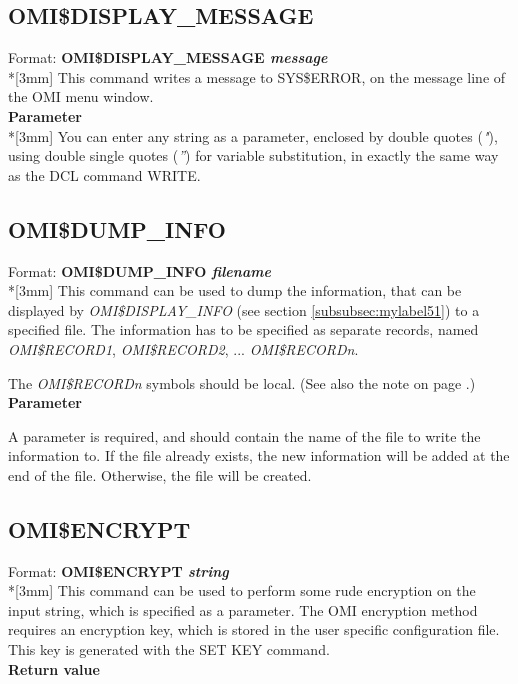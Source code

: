 \documentclass[a4paper]{book}
\renewcommand{\indent}{\hspace*{5mm}}
\begin{document}
\subsection{OMI{\$}DISPLAY{\_}MESSAGE}
\label{subsubsec:mylabel52}
\indent Format: \textbf{OMI{\$}DISPLAY{\_}MESSAGE \textit{message}}\\*[3mm]
This command writes a message to SYS{\$}ERROR, on the message line of the 
OMI menu window.\\[3mm]
\textbf{Parameter}\\*[3mm]
You can enter any string as a parameter, enclosed by double quotes (\textsl{"}), 
using double single quotes (\textsl{''}) for variable substitution, in exactly the 
same way as the DCL command WRITE.

\subsection{OMI{\$}DUMP{\_}INFO}
\label{subsubsec:mylabel53}

\indent Format: \textbf{OMI{\$}DUMP{\_}INFO \textit{filename}}\\*[3mm]
This command can be used to dump the information, that can be displayed by 
\textsl{OMI{\$}DISPLAY{\_}INFO} (see section \ref{subsubsec:mylabel51}) to a 
specified file. The information has to be specified as separate records, 
named \textsl{OMI{\$}RECORD1}, \textsl{OMI{\$}RECORD2}, ... \textsl{OMI{\$}RECORD\textit{n}}.

The \textsl{OMI{\$}RECORD\textit{n}} symbols should be local.
(See also the note on page \pageref{note:dispinfo}.)\\[3mm]
\textbf{Parameter}

\noindent A parameter is required, and should contain the name of the file to write 
the information to. If the file already exists, the new information will be 
added at the end of the file. Otherwise, the file will be created.


\subsection{OMI{\$}ENCRYPT}
\label{subsubsec:mylabel54}

\indent Format: \textbf{OMI{\$}ENCRYPT \textit{string}}\\*[3mm]
This command can be used to perform some rude encryption on the input 
string, which is specified as a parameter. The OMI encryption method 
requires an encryption key, which is stored in the user specific 
configuration file. This key is generated with the \textsf{SET KEY} command.\\[3mm]
\textbf{Return value}
\end{document}
